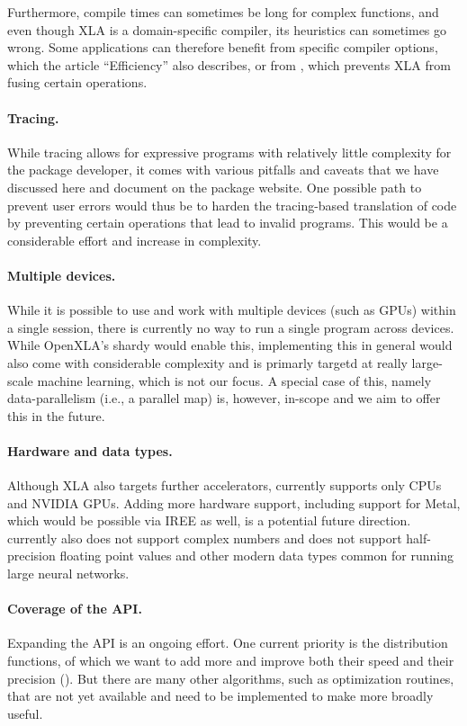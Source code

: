 \documentclass[article,shortnames]{jss}
\begin{document}
Furthermore, compile times can sometimes be long for complex functions, and even though XLA is a domain-specific compiler, its heuristics can sometimes go wrong.
Some applications can therefore benefit from specific compiler options, which the article ``Efficiency'' also describes, or from , which prevents XLA from fusing certain operations.

\paragraph{Tracing.}
While tracing allows for expressive programs with relatively little complexity for the package developer, it comes with various pitfalls and caveats that we have discussed here and document on the package website.
One possible path to prevent user errors would thus be to harden the tracing-based translation of  code by preventing certain operations that lead to invalid programs.
This would be a considerable effort and increase in complexity.

\paragraph{Multiple devices.}
While it is possible to use and work with multiple devices (such as GPUs) within a single  session, there is currently no way to run a single program across devices.
While OpenXLA's shardy would enable this, implementing this in general would also come with considerable complexity and is primarly targetd at really large-scale machine learning, which is not our focus.
A special case of this, namely data-parallelism (i.e., a parallel map) is, however, in-scope and we aim to offer this in the future.

\paragraph{Hardware and data types.}
Although XLA also targets further accelerators,  currently supports only CPUs and NVIDIA GPUs.
Adding more hardware support, including support for Metal, which would be possible via IREE as well, is a potential future direction.
 currently also does not support complex numbers and does not support half-precision floating point values and other modern data types common for running large neural networks.

\paragraph{Coverage of the API.}
Expanding the API is an ongoing effort.
One current priority is the distribution functions, of which we want to add more and improve both their speed and their precision ().
But there are many other algorithms, such as optimization routines, that are not yet available and need to be implemented to make  more broadly useful.
\end{document}
